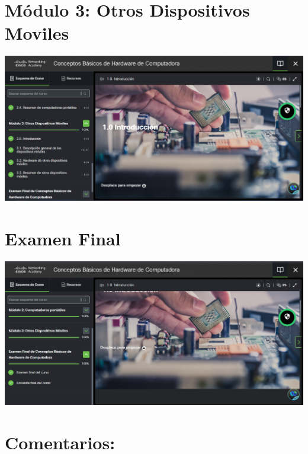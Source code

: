 \documentclass{article}
\begin{document}
\section{Módulo 3: Otros Dispositivos Moviles}
\label{sec:org04c6506}

\begin{center}
\includegraphics[width=.9\linewidth]{./images/modulo3.png}
\end{center}

\section{Examen Final}
\label{sec:org0686bb3}

\begin{center}
\includegraphics[width=.9\linewidth]{./images/examen.png}
\end{center}


\section{Comentarios:}
\label{sec:org538c6f4}
\end{document}
